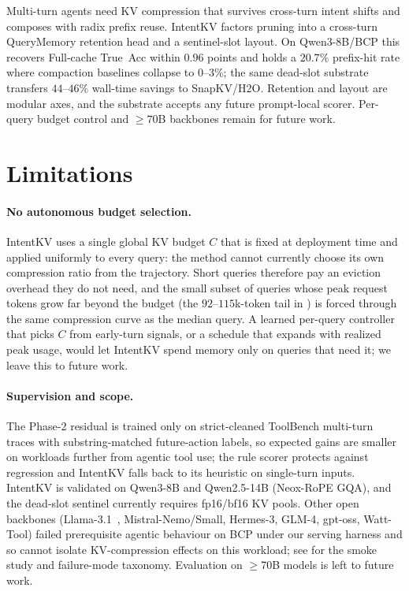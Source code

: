 \documentclass[11pt]{article}
\newcommand{\method}{IntentKV\xspace}
\newcommand{\learn}{Phase-2\xspace}
\begin{document}
Multi-turn agents need KV compression that survives cross-turn
intent shifts and composes with radix prefix reuse. \method
factors pruning into a cross-turn QueryMemory retention head and
a sentinel-slot layout. On Qwen3-8B/BCP this recovers Full-cache
True~Acc within $0.96$ points and holds a $20.7\%$ prefix-hit rate
where compaction baselines collapse to $0$--$3\%$; the same
dead-slot substrate transfers $44$--$46\%$ wall-time savings to
SnapKV/H2O. Retention and layout are modular axes, and the
substrate accepts any future prompt-local scorer.
Per-query budget control and $\geq\!70$B backbones remain
for future work.

\section*{Limitations}
\label{sec:limitations}

\paragraph{No autonomous budget selection.}
\method uses a single global KV budget $C$ that is fixed at
deployment time and applied uniformly to every query: the method
cannot currently choose its own compression ratio from the
trajectory. Short queries therefore pay an eviction overhead they do
not need, and the small subset of queries whose peak request tokens
grow far beyond the budget (the $92$--$115$k-token tail in
) is forced through the same compression
curve as the median query. A learned per-query controller that picks
$C$ from early-turn signals, or a schedule that expands with realized
peak usage, would let \method spend memory only on queries that need
it; we leave this to future work.

\paragraph{Supervision and scope.}
The \learn residual is trained only on strict-cleaned ToolBench
multi-turn traces with substring-matched future-action labels, so
expected gains are smaller on workloads further from agentic tool
use; the rule scorer protects against regression and \method falls
back to its heuristic on single-turn inputs. \method is validated on
Qwen3-8B and Qwen2.5-14B (Neox-RoPE GQA), and the dead-slot sentinel
currently requires fp16/bf16 KV pools. Other open backbones
(Llama-3.1~\citep{grattafiori2024llama}, Mistral-Nemo/Small, Hermes-3, GLM-4, gpt-oss, Watt-Tool)
failed prerequisite agentic behaviour on BCP under our serving harness
and so cannot isolate KV-compression effects on this workload; see
 for the smoke study and failure-mode
taxonomy. Evaluation on $\geq$70B models is left to future work.
\end{document}
